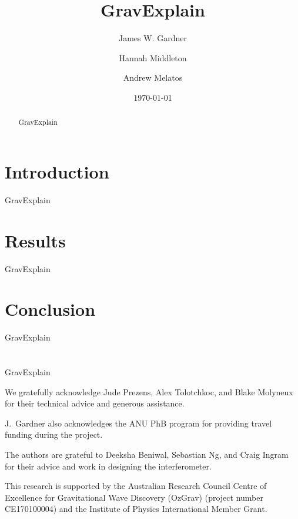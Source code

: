 \documentclass[prb,preprint]{revtex4-1}
\begin{document}
\title{GravExplain}

\author{James W. Gardner}

\author{Hannah Middleton}
\author{Andrew Melatos}

\date{\today}

\begin{abstract}
GravExplain

\end{abstract}

\maketitle

\section{Introduction}
GravExplain




\section{Results}
GravExplain


\section{Conclusion}
GravExplain


\appendix
\section{}
GravExplain


\begin{acknowledgments}
We gratefully acknowledge Jude Prezens, Alex Tolotchkoc, and Blake Molyneux for their technical advice and generous assistance.

J.~Gardner also acknowledges the ANU PhB program for providing travel funding during the project.

The authors are grateful to Deeksha Beniwal, Sebastian Ng, and Craig Ingram for their advice and work in designing the interferometer. 

This research is supported by the Australian Research Council Centre of Excellence for Gravitational Wave Discovery (OzGrav) (project number CE170100004) and the Institute of Physics International Member Grant.



\end{acknowledgments}
\end{document}
